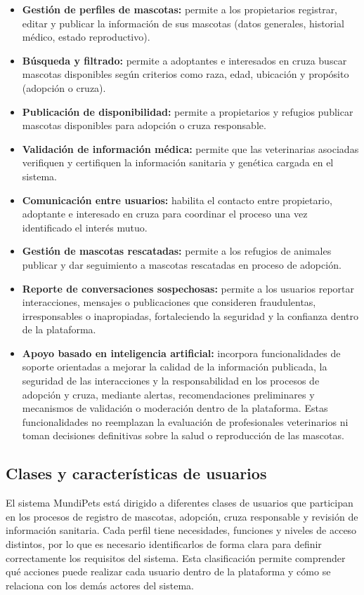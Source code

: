 \documentclass[journal,onecolumn]{IEEEtran}
\begin{document}
	\begin{itemize}[leftmargin=*]
		\item \textbf{Gestión de perfiles de mascotas:} permite a los propietarios registrar, editar y publicar la información de sus mascotas (datos generales, historial médico, estado reproductivo).
		\item \textbf{Búsqueda y filtrado:} permite a adoptantes e interesados en cruza buscar mascotas disponibles según criterios como raza, edad, ubicación y propósito (adopción o cruza).
		\item \textbf{Publicación de disponibilidad:} permite a propietarios y refugios publicar mascotas disponibles para adopción o cruza responsable.
		\item \textbf{Validación de información médica:} permite que las veterinarias asociadas verifiquen y certifiquen la información sanitaria y genética cargada en el sistema.
		\item \textbf{Comunicación entre usuarios:} habilita el contacto entre propietario, adoptante e interesado en cruza para coordinar el proceso una vez identificado el interés mutuo.
		\item \textbf{Gestión de mascotas rescatadas:} permite a los refugios de animales publicar y dar seguimiento a mascotas rescatadas en proceso de adopción.
		\item \textbf{Reporte de conversaciones sospechosas:} permite a los usuarios reportar interacciones, mensajes o publicaciones que consideren fraudulentas, irresponsables o inapropiadas, fortaleciendo la seguridad y la confianza dentro de la plataforma.
		\item \textbf{Apoyo basado en inteligencia artificial:} incorpora funcionalidades de soporte orientadas a mejorar la calidad de la información publicada, la seguridad de las interacciones y la responsabilidad en los procesos de adopción y cruza, mediante alertas, recomendaciones preliminares y mecanismos de validación o moderación dentro de la plataforma. Estas funcionalidades no reemplazan la evaluación de profesionales veterinarios ni toman decisiones definitivas sobre la salud o reproducción de las mascotas.
	\end{itemize}
	
	\subsection{Clases y características de usuarios}
	\label{sec:perfiles}
	
	El sistema MundiPets está dirigido a diferentes clases de usuarios que
	participan en los procesos de registro de mascotas, adopción, cruza
	responsable y revisión de información sanitaria. Cada perfil tiene
	necesidades, funciones y niveles de acceso distintos, por lo que es necesario
	identificarlos de forma clara para definir correctamente los requisitos del
	sistema. Esta clasificación permite comprender qué acciones puede realizar
	cada usuario dentro de la plataforma y cómo se relaciona con los demás actores
	del sistema.
	
\end{document}
